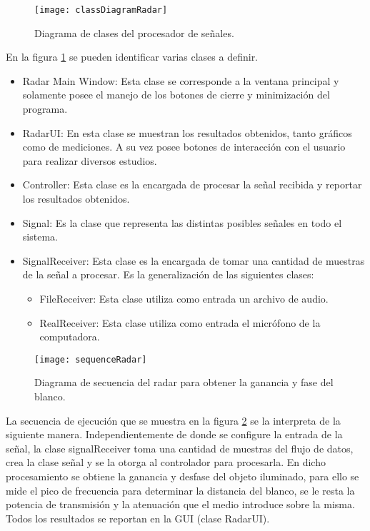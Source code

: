 \begin{figure}
 \centering
 \texttt{[image: classDiagramRadar]}
 \caption{Diagrama de clases del procesador de señales.}
 \label{fig:RadarsClassDiagram}
\end{figure}
En la figura \ref{fig:RadarsClassDiagram} se pueden identificar varias clases a definir.
\begin{itemize}
  \item Radar Main Window: Esta clase se corresponde a la ventana principal y solamente posee el manejo de los botones de cierre y minimización del programa.
  \item RadarUI: En esta clase se muestran los resultados obtenidos, tanto gráficos como de mediciones. A su vez posee botones de interacción con el usuario para realizar diversos estudios.
  \item Controller: Esta clase es la encargada de procesar la señal recibida y reportar los resultados obtenidos.
  \item Signal: Es la clase que representa las distintas posibles señales en todo el sistema.
  \item SignalReceiver: Esta clase es la encargada de tomar una cantidad de muestras de la señal a procesar. Es la generalización de las siguientes clases:
  \begin{itemize}
    \item FileReceiver: Esta clase utiliza como entrada un archivo de audio.
    \item RealReceiver: Esta clase utiliza como entrada el micrófono de la computadora.
  \end{itemize}
\end{itemize}

\begin{figure}[htb]
 \centering
 \texttt{[image: sequenceRadar]}
 \caption{Diagrama de secuencia del radar para obtener la ganancia y fase del blanco.}
 \label{fig:radarsSequence}
\end{figure}
La secuencia de ejecución que se muestra en la figura \ref{fig:radarsSequence} se la interpreta de la siguiente manera. Independientemente de donde se configure la entrada de la señal, la clase signalReceiver toma una cantidad de muestras del flujo de datos, crea la clase señal y se la otorga al controlador para procesarla. En dicho procesamiento se obtiene la ganancia y desfase del objeto iluminado, para ello se mide el pico de frecuencia para determinar la distancia del blanco, se le resta la potencia de transmisión y la atenuación que el medio introduce sobre la misma. Todos los resultados se reportan en la GUI (clase RadarUI).

